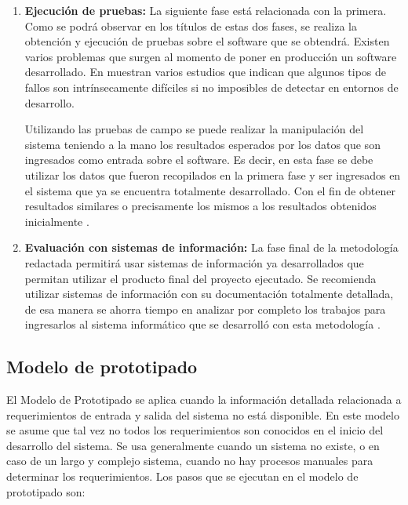 \begin{enumerate}
	\item \textbf{Ejecución de pruebas:} La siguiente fase está relacionada con la primera. Como se podrá observar en los títulos de estas dos fases, se realiza la obtención y ejecución de pruebas sobre el software que se obtendrá. Existen varios problemas que surgen al momento de poner en producción un software desarrollado. En \cite{Gazzola2022} muestran varios estudios que indican que algunos tipos de fallos son intrínsecamente difíciles si no imposibles de detectar en entornos de desarrollo.
	
	Utilizando las pruebas de campo se puede realizar la manipulación del sistema teniendo a la mano los resultados esperados por los datos que son ingresados como entrada sobre el software. Es decir, en esta fase se debe utilizar los datos que fueron recopilados en la primera fase y ser ingresados en el sistema que ya se encuentra totalmente desarrollado. Con el fin de obtener resultados similares o precisamente los mismos a los resultados obtenidos inicialmente \cite{Gazzola2022}.
	
	\item \textbf{Evaluación con sistemas de información:} La fase final de la metodología redactada permitirá usar sistemas de información ya desarrollados que permitan utilizar el producto final del proyecto ejecutado. Se recomienda utilizar sistemas de información con su documentación totalmente detallada, de esa manera se ahorra tiempo en analizar por completo los trabajos para ingresarlos al sistema informático que se desarrolló con esta metodología \cite{Whiting2022}.
	
	
\end{enumerate}

\subsection{Modelo de prototipado}
El Modelo de Prototipado se aplica cuando la información detallada relacionada a requerimientos de entrada y salida del sistema no está disponible. En este modelo se asume que tal vez no todos los requerimientos son conocidos en el inicio del desarrollo del sistema. Se usa generalmente cuando un sistema no existe, o en caso de un largo y complejo sistema, cuando no hay procesos manuales para determinar los requerimientos. Los pasos que se ejecutan en el modelo de prototipado son: 

